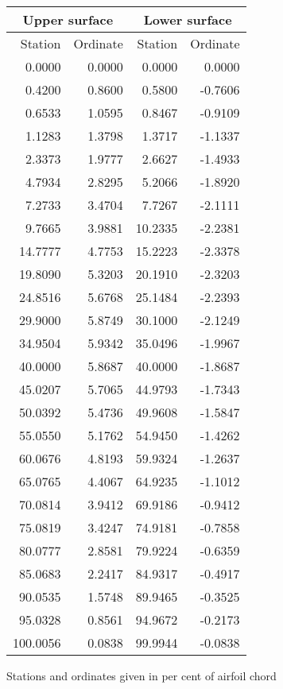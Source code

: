 \documentclass[11pt]{book}
\begin{document}
 \hspace{4mm}
 \begin{tabular}{|r|r|r|r|} \hline 
 \multicolumn{2}{|c|}{Upper surface} & \multicolumn{2}{|c|}{Lower surface} \\
 \hline
 Station & Ordinate & Station & Ordinate \\
 \hline
0.0000 & 0.0000 & 0.0000 & 0.0000 \\
0.4200 & 0.8600 & 0.5800 & -0.7606 \\
0.6533 & 1.0595 & 0.8467 & -0.9109 \\
1.1283 & 1.3798 & 1.3717 & -1.1337 \\
2.3373 & 1.9777 & 2.6627 & -1.4933 \\
4.7934 & 2.8295 & 5.2066 & -1.8920 \\
7.2733 & 3.4704 & 7.7267 & -2.1111 \\
9.7665 & 3.9881 & 10.2335 & -2.2381 \\
14.7777 & 4.7753 & 15.2223 & -2.3378 \\
19.8090 & 5.3203 & 20.1910 & -2.3203 \\
24.8516 & 5.6768 & 25.1484 & -2.2393 \\
29.9000 & 5.8749 & 30.1000 & -2.1249 \\
34.9504 & 5.9342 & 35.0496 & -1.9967 \\
40.0000 & 5.8687 & 40.0000 & -1.8687 \\
45.0207 & 5.7065 & 44.9793 & -1.7343 \\
50.0392 & 5.4736 & 49.9608 & -1.5847 \\
55.0550 & 5.1762 & 54.9450 & -1.4262 \\
60.0676 & 4.8193 & 59.9324 & -1.2637 \\
65.0765 & 4.4067 & 64.9235 & -1.1012 \\
70.0814 & 3.9412 & 69.9186 & -0.9412 \\
75.0819 & 3.4247 & 74.9181 & -0.7858 \\
80.0777 & 2.8581 & 79.9224 & -0.6359 \\
85.0683 & 2.2417 & 84.9317 & -0.4917 \\
90.0535 & 1.5748 & 89.9465 & -0.3525 \\
95.0328 & 0.8561 & 94.9672 & -0.2173 \\
100.0056 & 0.0838 & 99.9944 & -0.0838 \\
 \hline 
 \end{tabular}
 \vspace{8mm}

Stations and ordinates given in per cent of airfoil chord
\end{document}
